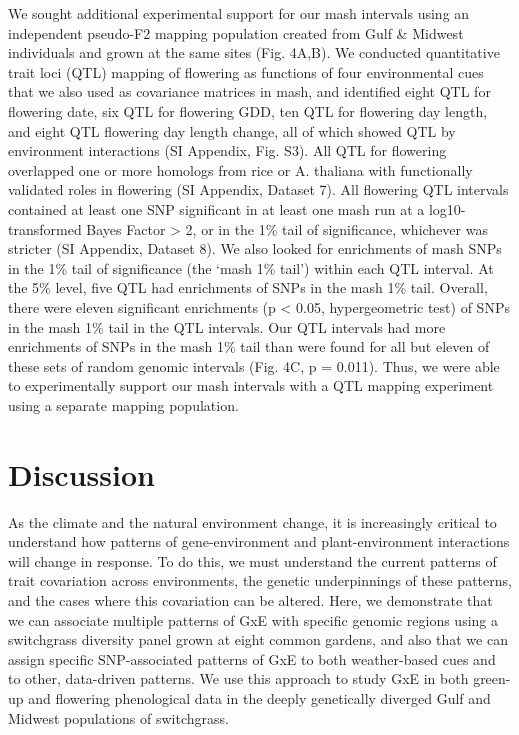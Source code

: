 \documentclass[
  9pt,
  twocolumn,
  twoside]{pnas-new}
\begin{document}
We sought additional experimental support for our mash intervals using
an independent pseudo-F2 mapping population created from Gulf \& Midwest
individuals and grown at the same sites (Fig. 4A,B). We conducted
quantitative trait loci (QTL) mapping of flowering as functions of four
environmental cues that we also used as covariance matrices in mash, and
identified eight QTL for flowering date, six QTL for flowering GDD, ten
QTL for flowering day length, and eight QTL flowering day length change,
all of which showed QTL by environment interactions (SI Appendix, Fig.
S3). All QTL for flowering overlapped one or more homologs from rice or
A. thaliana with functionally validated roles in flowering (SI Appendix,
Dataset 7). All flowering QTL intervals contained at least one SNP
significant in at least one mash run at a log10-transformed Bayes Factor
\textgreater{} 2, or in the 1\% tail of significance, whichever was
stricter (SI Appendix, Dataset 8). We also looked for enrichments of
mash SNPs in the 1\% tail of significance (the `mash 1\% tail') within
each QTL interval. At the 5\% level, five QTL had enrichments of SNPs in
the mash 1\% tail. Overall, there were eleven significant enrichments (p
\textless{} 0.05, hypergeometric test) of SNPs in the mash 1\% tail in
the QTL intervals. Our QTL intervals had more enrichments of SNPs in the
mash 1\% tail than were found for all but eleven of these sets of random
genomic intervals (Fig. 4C, p = 0.011). Thus, we were able to
experimentally support our mash intervals with a QTL mapping experiment
using a separate mapping population.

\section{Discussion}\label{discussion}

As the climate and the natural environment change, it is increasingly
critical to understand how patterns of gene-environment and
plant-environment interactions will change in response. To do this, we
must understand the current patterns of trait covariation across
environments, the genetic underpinnings of these patterns, and the cases
where this covariation can be altered. Here, we demonstrate that we can
associate multiple patterns of GxE with specific genomic regions using a
switchgrass diversity panel grown at eight common gardens, and also that
we can assign specific SNP-associated patterns of GxE to both
weather-based cues and to other, data-driven patterns. We use this
approach to study GxE in both green-up and flowering phenological data
in the deeply genetically diverged Gulf and Midwest populations of
switchgrass.
\end{document}
